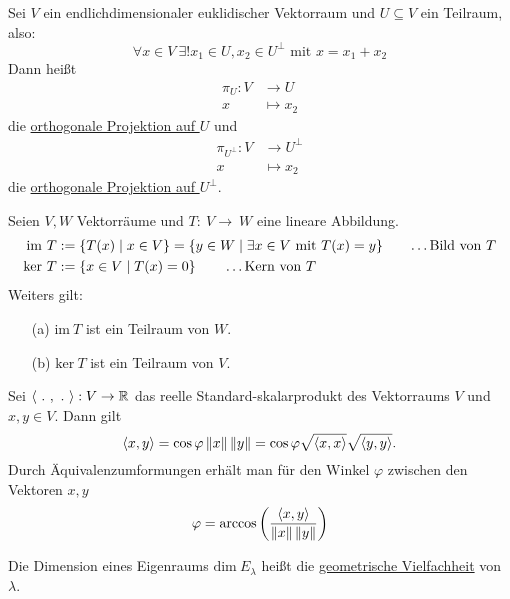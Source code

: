 \begin{definition}
     Sei $V$ ein endlichdimensionaler euklidischer Vektorraum 
    und $U\subseteq V$ ein Teilraum, also:
    \[
        \forall x \in V\ \exists! x_1\in U, x_2\in U^\bot\text{ mit } x = x_1 + x_2
    \]
    Dann heißt 
    \begin{align*}
        \pi_U : V &\to U\\
        x&\mapsto x_2
    \end{align*}
    die \underline{orthogonale Projektion auf $U$} und
    \begin{align*}
        \pi_{U^\bot} : V &\to U^\bot\\
        x &\mapsto x_2
    \end{align*}
    die \underline{orthogonale Projektion auf $U^\bot$}.
\end{definition}
\begin{definition}
     Seien $V,W$ Vektorräume und $T:~V\to~W$ eine lineare Abbildung.
    \begin{align*}
        \mathrm{im}\ T &:=\{T(x)\mid x\in V\} = \{y\in W\mid \exists x \in V \text{ mit } T(x)=y\}\qquad\text{\dots Bild von }T\\
        \mathrm{ker}\ T &:= \{x\in V\mid T(x) = 0\}\qquad \dots\text{Kern von }T
    \end{align*}
    Weiters gilt:
    \begin{enumerate}
        \item[(a)] $\mathrm{im}\ T$ ist ein Teilraum von $W$.
        \item[(b)] $\mathrm{ker}\ T$ ist ein Teilraum von $V$.
    \end{enumerate}
\end{definition}
\begin{definition}
     Sei $\left\langle \ .\ ,\ .\  \right\rangle :V\to\mathbb{R}$ das reelle Standard-skalarprodukt
    des Vektorraums $V$ und $x,y\in V$. Dann gilt
    \[
        \left\langle x,y \right\rangle = \cos \varphi\left\lVert x \right\rVert\left\lVert y \right\rVert = \cos \varphi \sqrt{\left\langle x,x \right\rangle}\sqrt{\left\langle y,y \right\rangle}.
    \]
    Durch Äquivalenzumformungen erhält man für den Winkel $\varphi$ zwischen den Vektoren $x,y$
    \[
        \varphi = \arccos \left(\frac{
            \left\langle x,y \right\rangle
        }{
            \left\lVert x \right\rVert\left\lVert y \right\rVert
        }\right)
    \]
\end{definition}
\begin{definition}
     Die Dimension eines Eigenraums $\mathrm{dim}\ E_\lambda$ heißt
    die \underline{geometrische Vielfachheit} von $\lambda$.
\end{definition}
